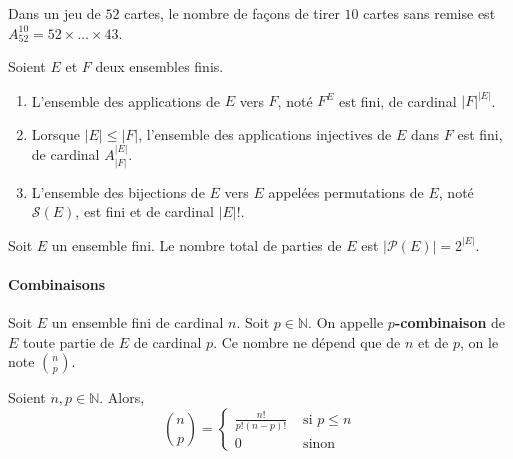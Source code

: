   \begin{example}
    Dans un jeu de $52$ cartes, le nombre de façons de tirer $10$ cartes sans remise est $A^{10}_{52} = 52 \times \dots \times 43$.
  \end{example}

  \begin{application}
    Soient $E$ et $F$ deux ensembles finis.
    \begin{enumerate}[label={\bfseries(\roman*)}]
      \item L'ensemble des applications de $E$ vers $F$, noté $F^E$ est fini, de cardinal $\vert F \vert^{\vert E \vert}$.
      \item Lorsque $\vert E \vert \leq \vert F \vert$, l'ensemble des applications injectives de $E$ dans $F$ est fini, de cardinal $A_{\vert F \vert}^{\vert E \vert}$.
      \item L'ensemble des bijections de $E$ vers $E$ appelées permutations de $E$, noté $\mathcal{S}(E)$, est fini et de cardinal $\vert E \vert!$.
    \end{enumerate}
  \end{application}

  \begin{corollary}
    Soit $E$ un ensemble fini. Le nombre total de parties de $E$ est $\vert \mathcal{P}(E) \vert = 2^{\vert E \vert}$.
  \end{corollary}

  \paragraph{Combinaisons}

  \begin{definition}
    Soit $E$ un ensemble fini de cardinal $n$. Soit $p \in \mathbb{N}$. On appelle \textbf{$p$-combinaison} de $E$ toute partie de $E$ de cardinal $p$. Ce nombre ne dépend que de $n$ et de $p$, on le note $\binom{n}{p}$.
  \end{definition}

  \begin{proposition}
    Soient $n, p \in \mathbb{N}$. Alors,
    \[
      \binom{n}{p} =
      \begin{cases}
        \frac{n!}{p! (n-p)!} &\text{ si } p \leq n \\
        0 &\text{ sinon}
      \end{cases}
    \]
  \end{proposition}

